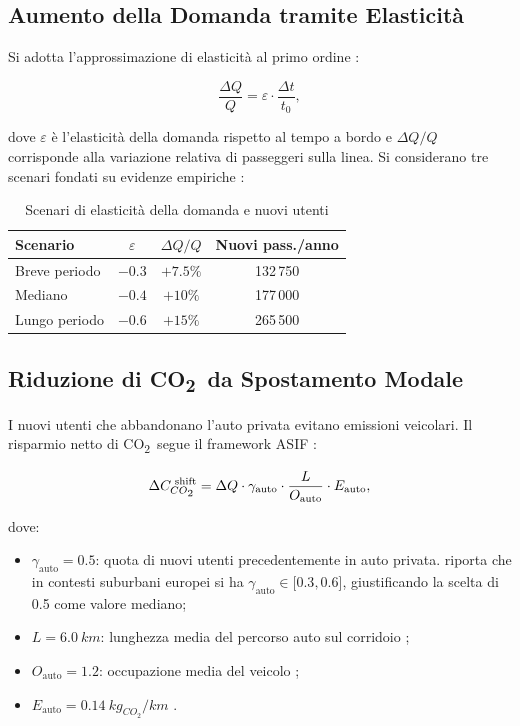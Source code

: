 \documentclass[conference]{IEEEtran}
\newcommand{\co}{CO\textsubscript{2}}
\begin{document}
\subsection{Aumento della Domanda tramite Elasticità}

Si adotta l'approssimazione di elasticità al primo ordine
\cite{ortuzar2011}:

\begin{equation}
  \frac{\Delta Q}{Q} = \varepsilon \cdot \frac{\Delta t}{t_0},
  \label{eq:elasticity}
\end{equation}

dove $\varepsilon$ è l'elasticità della domanda rispetto al tempo
a bordo e $\Delta Q / Q$ corrisponde alla variazione relativa di passeggeri sulla linea. Si considerano tre scenari fondati su evidenze empiriche \cite{litman2023}:

\begin{table}[htbp]
\caption{Scenari di elasticità della domanda e nuovi utenti}
\label{tab:elasticity}
\centering
\renewcommand{\arraystretch}{0.99}
\begin{tabular}{@{}lccc@{}}
\toprule
Scenario & $\varepsilon$ & $\Delta Q/Q$ & Nuovi pass./anno \\
\midrule
Breve periodo  & $-0.3$ & $+7.5\%$  & 132\,750  \\
Mediano        & $-0.4$ & $+10\%$ & 177\,000 \\
Lungo periodo  & $-0.6$ & $+15\%$ & 265\,500 \\
\bottomrule
\end{tabular}
\end{table}

\subsection{Riduzione di \co\ da Spostamento Modale}

I nuovi utenti che abbandonano l'auto privata evitano emissioni
veicolari. Il risparmio netto di \co\ segue il framework ASIF
\cite{IEA_schipper}:

\begin{equation}
  \Delta C_{\co}^{\text{ shift}} = \Delta Q \cdot \gamma_\text{auto}
    \cdot \frac{L}{O_\text{auto}} \cdot E_\text{auto},
  \label{eq:co2_shift}
\end{equation}

dove:
\begin{itemize}
  \item $\gamma_\text{auto} = 0.5$: quota di nuovi utenti
    precedentemente in auto privata. \cite{litman2023} riporta che in contesti suburbani europei si ha  $\gamma_\text{auto} \in [0.3,0.6$], giustificando la scelta di 0.5 come valore mediano;
  \item $L = \SI{6,0}{km}$: lunghezza media del percorso auto
    sul corridoio \cite{amp_imq2022_report};
  \item $O_\text{auto} = 1.2$: occupazione media del veicolo
    \cite{mit_cnit};
  \item $E_\text{auto} = \SI{0.14}{kg_{CO_2}/km}$ \cite{ispra2023}.
\end{itemize}
\end{document}
